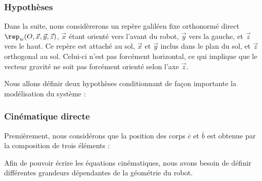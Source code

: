 			\subsubsection{Hypothèses}
			\label{section.hypothese}
			
				Dans la suite, nous considèrerons un repère galiléen fixe orthonormé direct $\rep_w(O, \vec{x},\vec{y},\vec{z})$, $\vec{x}$ étant orienté vers l'avant du robot, $\vec{y}$ vers la gauche, et $\vec{z}$ vers le haut. 
				Ce repère est attaché au sol, $\vec{x}$ et $\vec{y}$ inclus dans le plan du sol, et $\vec{z}$ orthogonal au sol. 
				Celui-ci n'est pas forcément horizontal, ce qui implique que le vecteur gravité ne soit pas forcément orienté selon l'axe $\vec{z}$.
					
				Nous allons définir deux hypothèses conditionnant de façon importante la modélisation du système :
			
			\subsubsection{Cinématique directe}
			
					
					Premièrement, nous considérons que la position des corps $\bar{c}$ et $\bar{b}$ est obtenue par la composition de trois éléments :
					
					Afin de pouvoir écrire les équations cinématiques, nous avons besoin de définir différentes grandeurs dépendantes de la géométrie du robot. 

